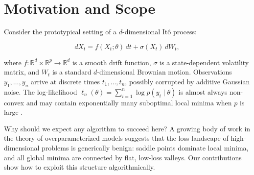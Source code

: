 \section{Motivation and Scope}

Consider the prototypical setting of a $d$-dimensional It\^{o} process:

\begin{equation}\label{eq:sde}
dX_{t} = f(X_{t}; \theta)\,dt + \sigma(X_{t})\,dW_{t},
\end{equation}

\noindent where $f: \mathbb{R}^{d} \times \mathbb{R}^{p} \to \mathbb{R}^{d}$ is a smooth drift function, $\sigma$ is a state-dependent volatility matrix, and $W_{t}$ is a standard $d$-dimensional Brownian motion. Observations $y_{1}, \ldots, y_{n}$ arrive at discrete times $t_{1}, \ldots, t_{n}$, possibly corrupted by additive Gaussian noise. The log-likelihood $\ell_{n}(\theta) = \sum_{i=1}^{n} \log p(y_{i} \mid \theta)$ is almost always non-convex and may contain exponentially many suboptimal local minima when $p$ is large \cite{choromanska2015}.

Why should we expect any algorithm to succeed here? A growing body of work in the theory of overparameterized models \cite{neyshabur2018,du2019} suggests that the loss landscape of high-dimensional problems is generically benign: saddle points dominate local minima, and all global minima are connected by flat, low-loss valleys. Our contributions show how to exploit this structure algorithmically.
